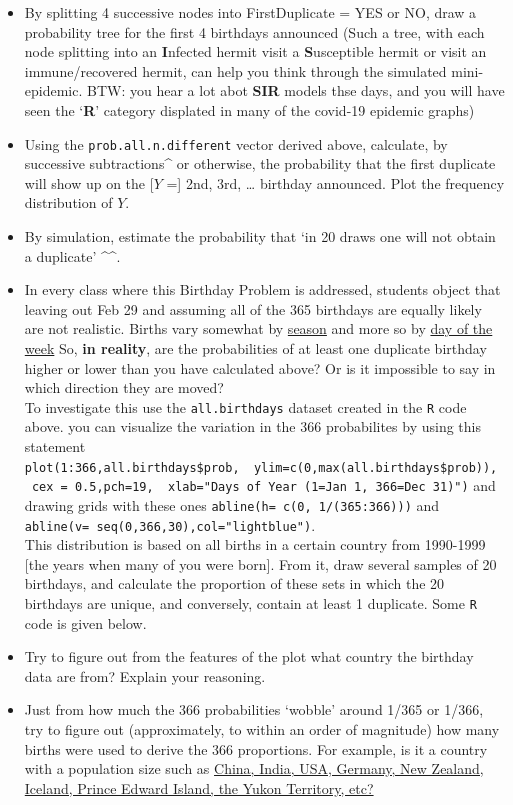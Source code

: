 \documentclass[]{book}
\providecommand{\tightlist}{%
  \setlength{\itemsep}{0pt}\setlength{\parskip}{0pt}}
\begin{document}
\begin{itemize}
\tightlist
\item
  By splitting 4 successive nodes into FirstDuplicate = YES or NO, draw a probability tree for the first 4 birthdays announced (Such a tree, with each node splitting into an \textbf{I}nfected hermit visit a \textbf{S}usceptible hermit or visit an immune/recovered hermit, can help you think through the simulated mini-epidemic. BTW: you hear a lot abot \textbf{SIR} models thse days, and you will have seen the `\textbf{R}' category displated in many of the covid-19 epidemic graphs)
\item
  Using the \texttt{prob.all.n.different} vector derived above, calculate, by successive subtractions\^{} or otherwise, the probability that the first duplicate will show up on the {[}\(Y\) ={]} 2nd, 3rd, \ldots{} birthday announced. Plot the frequency distribution of \(Y\).
\item
  By simulation, estimate the probability that `in 20 draws one will not obtain a duplicate' \^{}\^{}.
\item
  In every class where this Birthday Problem is addressed, students object that leaving out Feb 29 and assuming all of the 365 birthdays are equally likely are not realistic. Births vary somewhat by \href{https://www.significancemagazine.com/science/542-most-popular-birthday-england-wales}{season} and more so by \href{https://www.significancemagazine.com/585}{day of the week}
  So, \textbf{in reality}, are the probabilities of at least one duplicate birthday higher or lower than you have calculated above? Or is it impossible to say in which direction they are moved?\\
  To investigate this use the \texttt{all.birthdays} dataset created in the \texttt{R} code above. you can visualize the variation in the 366 probabilites by using this statement \texttt{plot(1:366,all.birthdays\$prob,\ \ ylim=c(0,max(all.birthdays\$prob)),\ \ cex\ =\ 0.5,pch=19,\ \ xlab="Days\ of\ Year\ (1=Jan\ 1,\ 366=Dec\ 31)")} and drawing grids with these ones \texttt{abline(h=\ c(0,\ 1/(365:366)))} and \texttt{abline(v=\ seq(0,366,30),col="lightblue")}.\\
  This distribution is based on all births in a certain country from 1990-1999 {[}the years when many of you were born{]}. From it, draw several samples of 20 birthdays, and calculate the proportion of these sets in which the 20 birthdays are unique, and conversely, contain at least 1 duplicate. Some \texttt{R} code is given below.
\item
  Try to figure out from the features of the plot what country the birthday data are from? Explain your reasoning.
\item
  Just from how much the 366 probabilities `wobble' around 1/365 or 1/366, try to figure out (approximately, to within an order of magnitude) how many births were used to derive the 366 proportions. For example, is it a country with a population size such as \href{https://www.worldometers.info/world-population/population-by-country/}{China, India, USA, Germany, New Zealand, Iceland, Prince Edward Island, the Yukon Territory, etc?}
\end{itemize}
\end{document}
